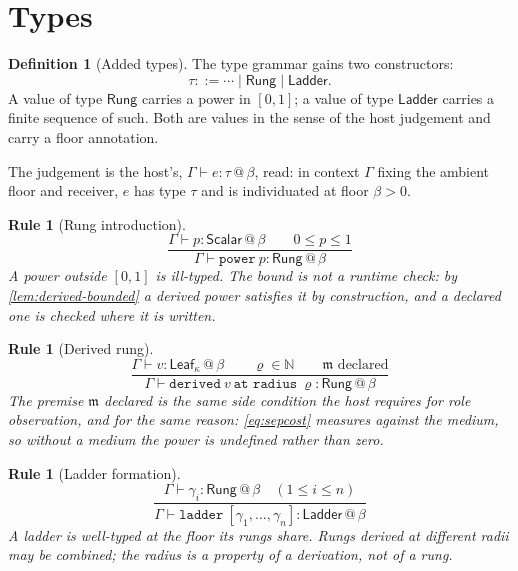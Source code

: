 \documentclass[11pt,twocolumn,a4paper]{article}
\theoremstyle{plain}
\newtheorem{rulename}[theorem]{Rule}
\theoremstyle{definition}
\newtheorem{definition}[theorem]{Definition}
\theoremstyle{remark}
\newcommand{\N}{\mathbb{N}}
\newcommand{\Gph}{\Gamma}
\newcommand{\med}{\mathfrak{m}}
\newcommand{\flo}{\beta}
\newcommand{\Rung}{\gamma}
\newcommand{\rad}{\varrho}
\newcommand{\shk}[1]{\texttt{#1}}
\begin{document}
\section{Types}
\label{sec:typing}

\begin{definition}[Added types]
\label{def:types}
The type grammar gains two constructors:
\[
\tau ::= \cdots \mid \mathsf{Rung} \mid \mathsf{Ladder}.
\]
A value of type $\mathsf{Rung}$ carries a power in $[0,1]$; a value of type
$\mathsf{Ladder}$ carries a finite sequence of such. Both are values in the
sense of the host judgement and carry a floor annotation.
\end{definition}

The judgement is the host's, $\Gph\vdash e:\tau\,@\,\flo$, read: in context
$\Gph$ fixing the ambient floor and receiver, $e$ has type $\tau$ and is
individuated at floor $\flo>0$.

\begin{rulename}[Rung introduction]
\label{rule:rung}
\[
\frac{\Gph\vdash p:\mathsf{Scalar}\,@\,\flo \qquad 0\le p\le 1}
     {\Gph\vdash \shk{power}\ p:\mathsf{Rung}\,@\,\flo}
\]
A power outside $[0,1]$ is ill-typed. The bound is not a runtime check: by
\cref{lem:derived-bounded} a derived power satisfies it by construction, and a
declared one is checked where it is written.
\end{rulename}

\begin{rulename}[Derived rung]
\label{rule:derived}
\[
\frac{\Gph\vdash v:\mathsf{Leaf}_\kappa\,@\,\flo \qquad
      \rad\in\N \qquad \med \text{ declared}}
     {\Gph\vdash \shk{derived}\ v\ \shk{at radius}\ \rad
      :\mathsf{Rung}\,@\,\flo}
\]
The premise $\med$ \emph{declared} is the same side condition the host requires
for role observation, and for the same reason: \cref{eq:sepcost} measures
against the medium, so without a medium the power is undefined rather than
zero.
\end{rulename}

\begin{rulename}[Ladder formation]
\label{rule:ladder}
\[
\frac{\Gph\vdash \Rung_i:\mathsf{Rung}\,@\,\flo \quad (1\le i\le n)}
     {\Gph\vdash \shk{ladder}\ [\Rung_1,\dots,\Rung_n]
      :\mathsf{Ladder}\,@\,\flo}
\]
A ladder is well-typed at the floor its rungs share. Rungs derived at different
radii may be combined; the radius is a property of a derivation, not of a rung.
\end{rulename}
\end{document}
